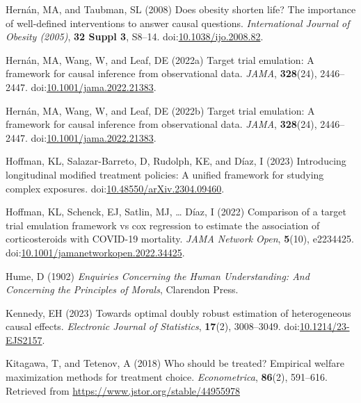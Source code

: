 \documentclass[
  singlecolumn,
  9pt]{article}
\begin{document}
\begin{CSLReferences}
Hernán, MA, and Taubman, SL (2008) Does obesity shorten life? The
importance of well-defined interventions to answer causal questions.
\emph{International Journal of Obesity (2005)}, \textbf{32 Suppl 3},
S8--14.
doi:\href{https://doi.org/10.1038/ijo.2008.82}{10.1038/ijo.2008.82}.

Hernán, MA, Wang, W, and Leaf, DE (2022a) Target trial emulation: A
framework for causal inference from observational data. \emph{JAMA},
\textbf{328}(24), 2446--2447.
doi:\href{https://doi.org/10.1001/jama.2022.21383}{10.1001/jama.2022.21383}.

Hernán, MA, Wang, W, and Leaf, DE (2022b) Target trial emulation: A
framework for causal inference from observational data. \emph{JAMA},
\textbf{328}(24), 2446--2447.
doi:\href{https://doi.org/10.1001/jama.2022.21383}{10.1001/jama.2022.21383}.

Hoffman, KL, Salazar-Barreto, D, Rudolph, KE, and Díaz, I (2023)
Introducing longitudinal modified treatment policies: A unified
framework for studying complex exposures.
doi:\href{https://doi.org/10.48550/arXiv.2304.09460}{10.48550/arXiv.2304.09460}.

Hoffman, KL, Schenck, EJ, Satlin, MJ, \ldots{} Díaz, I (2022) Comparison
of a target trial emulation framework vs cox regression to estimate the
association of corticosteroids with COVID-19 mortality. \emph{JAMA
Network Open}, \textbf{5}(10), e2234425.
doi:\href{https://doi.org/10.1001/jamanetworkopen.2022.34425}{10.1001/jamanetworkopen.2022.34425}.

Hume, D (1902) \emph{Enquiries Concerning the Human Understanding: And
Concerning the Principles of Morals}, Clarendon Press.

Kennedy, EH (2023) Towards optimal doubly robust estimation of
heterogeneous causal effects. \emph{Electronic Journal of Statistics},
\textbf{17}(2), 3008--3049.
doi:\href{https://doi.org/10.1214/23-EJS2157}{10.1214/23-EJS2157}.

Kitagawa, T, and Tetenov, A (2018) Who should be treated? Empirical
welfare maximization methods for treatment choice. \emph{Econometrica},
\textbf{86}(2), 591--616. Retrieved from
\url{https://www.jstor.org/stable/44955978}


\end{CSLReferences}
\end{document}
